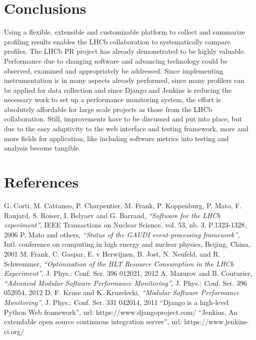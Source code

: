 \documentclass[a4paper]{jpconf}
\begin{document}
\section{Conclusions}
\label{sec:conclusions}

Using a flexible, extensible and customizable platform to collect and summarize profiling results enables the LHCb collaboration to systematically compare profiles. The LHCb PR project has already demonstrated to be highly valuable. Performance due to changing software and advancing technology could be observed, examined and appropriately be addressed. Since implementing instrumentation is in many aspects already performed, since many profilers can be applied for data collection and since Django and Jenkins is reducing the necessary work to set up a performance monitoring system, the effort is absolutely affordable for large scale projects as those from the LHCb collaboration. Still, improvements have to be discussed and put into place, but due to the easy adaptivity to the web interface and testing framework, more and more fields for application, like including software metrics into testing and analysis become tangible. 

\section*{References}

\begin{thebibliography}{9}
 G. Corti, M. Cattaneo, P. Charpentier, M. Frank, P. Koppenburg, P. Mato, F. Ranjard, S. Roiser, I. Belyaev and G. Barrand, {\it ``Software for the LHCb experiment''}, IEEE Transactions on Nuclear Science, vol. 53, nb. 3, P.1323-1328, 2006
 P. Mato and others, {\it ``Status of the GAUDI event-processing framework''}, Intl. conference on computing in high energy and nuclear physics, Beijing, China, 2001
M. Frank, C. Gaspar, E. v Herwijnen, B. Jost, N. Neufeld, and R. Schwemmer, {\it ``Optimization of the HLT Resource Consumption in the LHCb Experiment''}, J. Phys.: Conf. Ser. 396 012021, 2012
 A. Mazurov and B. Couturier, {\it ``Advanced Modular Software Performance Monitoring''}, J. Phys.: Conf. Ser. 396 052054, 2012
 D. F. Kruse and K. Kruzelecki, {\it ``Modular Software Performance Monitoring''}, J. Phys.: Conf. Ser. 331 042014, 2011
 ``Django is a high-level Python Web framework'', url: https://www.djangoproject.com/
 ``Jenkins, An extendable open source continuous integration server'', url: https://www.jenkins-ci.org/
\end{thebibliography}
\end{document}
